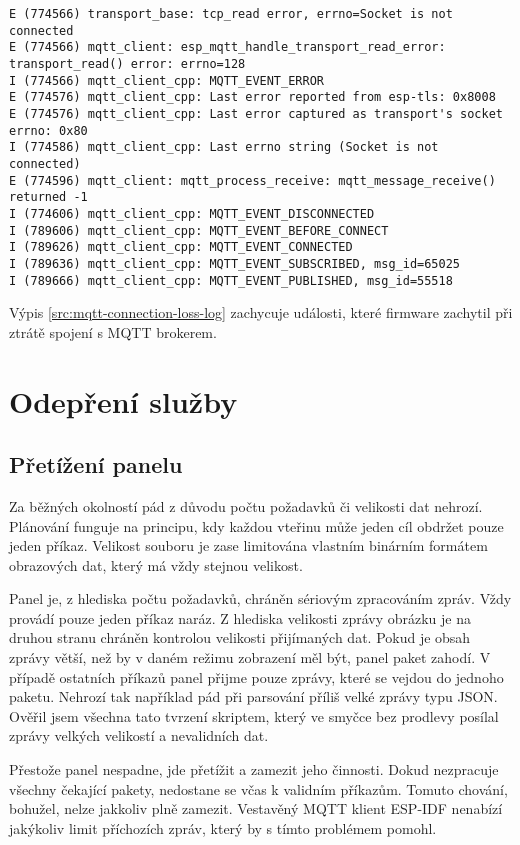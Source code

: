\begin{lstlisting}[label=src:mqtt-connection-loss-log,caption={Záznam událostí firmwaru při ztrátě spojení s MQTT brokerem}]
E (774566) transport_base: tcp_read error, errno=Socket is not connected
E (774566) mqtt_client: esp_mqtt_handle_transport_read_error: transport_read() error: errno=128
I (774566) mqtt_client_cpp: MQTT_EVENT_ERROR
E (774576) mqtt_client_cpp: Last error reported from esp-tls: 0x8008
E (774576) mqtt_client_cpp: Last error captured as transport's socket errno: 0x80
I (774586) mqtt_client_cpp: Last errno string (Socket is not connected)
E (774596) mqtt_client: mqtt_process_receive: mqtt_message_receive() returned -1
I (774606) mqtt_client_cpp: MQTT_EVENT_DISCONNECTED
I (789606) mqtt_client_cpp: MQTT_EVENT_BEFORE_CONNECT
I (789626) mqtt_client_cpp: MQTT_EVENT_CONNECTED
I (789636) mqtt_client_cpp: MQTT_EVENT_SUBSCRIBED, msg_id=65025
I (789666) mqtt_client_cpp: MQTT_EVENT_PUBLISHED, msg_id=55518
\end{lstlisting}

Výpis \ref{src:mqtt-connection-loss-log} zachycuje události, které firmware zachytil při ztrátě spojení s MQTT brokerem. 

\section{Odepření služby}
\subsection{Přetížení panelu}
Za běžných okolností pád z důvodu počtu požadavků či velikosti dat nehrozí. Plánování funguje na principu, kdy každou vteřinu může jeden cíl obdržet pouze jeden příkaz. Velikost souboru je zase limitována vlastním binárním formátem obrazových dat, který má vždy stejnou velikost.

Panel je, z hlediska počtu požadavků, chráněn sériovým zpracováním zpráv. Vždy provádí pouze jeden příkaz naráz. Z hlediska velikosti zprávy obrázku je na druhou stranu chráněn kontrolou velikosti přijímaných dat. Pokud je obsah zprávy větší, než by v daném režimu zobrazení měl být, panel paket zahodí. V případě ostatních příkazů panel přijme pouze zprávy, které se vejdou do jednoho paketu. Nehrozí tak například pád při parsování příliš velké zprávy typu JSON. Ověřil jsem všechna tato tvrzení skriptem, který ve smyčce bez prodlevy posílal zprávy velkých velikostí a nevalidních dat.

Přestože panel nespadne, jde přetížit a zamezit jeho činnosti. Dokud nezpracuje všechny čekající pakety, nedostane se včas k validním příkazům. Tomuto chování, bohužel, nelze jakkoliv plně zamezit. Vestavěný MQTT klient ESP-IDF nenabízí jakýkoliv limit příchozích zpráv, který by s tímto problémem pomohl.

